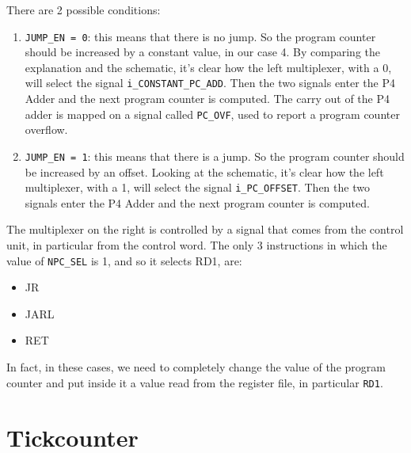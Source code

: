 There are 2 possible conditions:

\begin{enumerate}
  \item \texttt{JUMP\_EN = 0}: this means that there is no jump. So the program counter should be increased by a constant value, in our case 4. By comparing the explanation and the schematic, it's clear how the left multiplexer, with a 0, will select the signal \texttt{i\_CONSTANT\_PC\_ADD}. Then the two signals enter the P4 Adder and the next program counter is computed. The carry out of the P4 adder is mapped on a signal called \texttt{PC\_OVF}, used to report a program counter overflow. 
  \item \texttt{JUMP\_EN = 1}: this means that there is a jump. So the program counter should be increased by an offset. Looking at the schematic, it's clear how the left multiplexer, with a 1, will select the signal \texttt{i\_PC\_OFFSET}. Then the two signals enter the P4 Adder and the next program counter is computed. 
\end{enumerate}

The multiplexer on the right is controlled by a signal that comes from the control unit, in particular from the control word. The only 3 instructions in which the value of \texttt{NPC\_SEL} is 1, and so it selects RD1, are:

\begin{itemize}
  \item JR
  \item JARL
  \item RET
\end{itemize}

In fact, in these cases, we need to completely change the value of the program counter and put inside it a value read from the register file, in particular \texttt{RD1}.
\section{Tickcounter}

